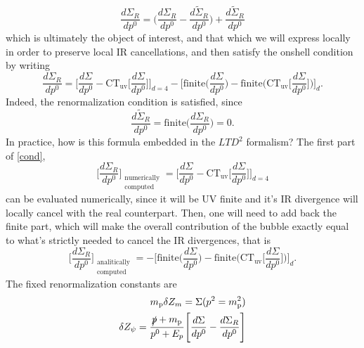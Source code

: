 \documentclass[11pt]{article}
\begin{document}
\begin{equation}
\frac{d\Sigma_R}{dp^0}=\Bigg(\frac{d\Sigma_R}{dp^0}-\frac{d\tilde\Sigma_R}{dp^0}\Bigg)+\frac{d\tilde\Sigma_R}{dp^0}
\end{equation}
which is ultimately the object of interest, and that which we will express locally in order to preserve local IR cancellations, and then satisfy the onshell condition by writing
\begin{equation}\label{cond}
\frac{d\Sigma_R}{dp^0}=\Bigg[\frac{d\Sigma}{dp^0}-\text{CT}_\text{uv}\Bigg[\frac{d\Sigma}{dp^0}\Bigg]\Bigg]_{d=4}-\Bigg[\text{finite}\Bigg(\frac{d\Sigma}{dp^0}\Bigg)-\text{finite}\Bigg(\text{CT}_\text{uv}\Bigg[\frac{d\Sigma}{dp^0}\Bigg]\Bigg)\Bigg]_d.
\end{equation}
Indeed, the renormalization condition is satisfied, since
\begin{equation}
\frac{d\tilde\Sigma_R}{dp^0}=\text{finite}\Bigg(\frac{d\Sigma_R}{dp^0}\Bigg)=0.\end{equation}
In practice, how is this formula embedded in the $LTD^2$ formalism? The first part of \eqref{cond},
\begin{equation}
\Bigg[\frac{d\Sigma_R}{dp^0}\Bigg]_{\substack{\text{numerically}\\ \text{computed}}}=\Bigg[\frac{d\Sigma}{dp^0}-\text{CT}_\text{uv}\Bigg[\frac{d\Sigma}{dp^0}\Bigg]\Bigg]_{d=4}
\end{equation}
 can be evaluated numerically, since it will be UV finite and it's IR divergence will locally cancel with the real counterpart. Then, one will need to add back the finite part, which will make the overall contribution of the bubble exactly equal to what's strictly needed to cancel the IR divergences, that is
  \begin{equation}
\Bigg[\frac{d\Sigma_R}{dp^0}\Bigg]_{\substack{\text{analitically}\\ \text{computed}}}=-\Bigg[\text{finite}\Bigg(\frac{d\Sigma}{dp^0}\Bigg)-\text{finite}\Bigg(\text{CT}_\text{uv}\Bigg[\frac{d\Sigma}{dp^0}\Bigg]\Bigg)\Bigg]_d.
\end{equation}
The fixed renormalization constants are
\begin{align}
m_\text{p} \delta Z_m=\Sigma(p^2=m_\text{p}^2) \\
\delta Z_\psi =\frac{\slashed p + m_\text{p}}{p^0+E_p}\Bigg[\frac{d\Sigma}{dp^0}-\frac{d\Sigma_R}{dp^0}\Bigg]
\end{align}




\end{document}
